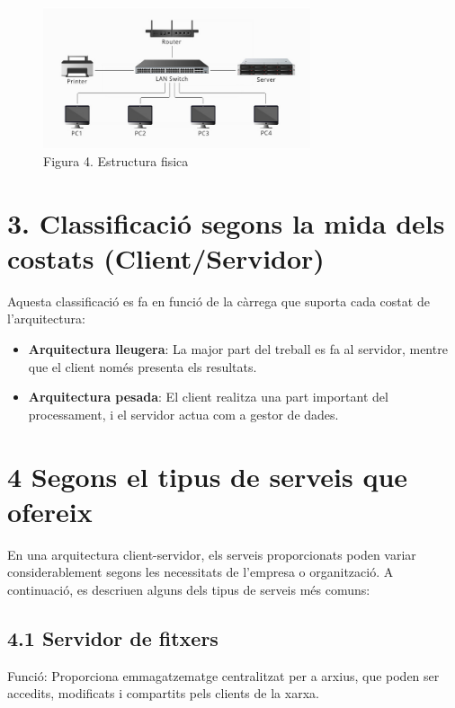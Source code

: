 \documentclass[
  a4paper,
]{article}
\providecommand{\tightlist}{%
  \setlength{\itemsep}{0pt}\setlength{\parskip}{0pt}}
\begin{document}
\begin{figure}
\centering
\includegraphics[width=0.7\textwidth,height=\textheight]{png/csXarxaFisica.png}
\caption{Figura 4. Estructura fisica}
\end{figure}

\section{3. Classificació segons la mida dels costats
(Client/Servidor)}\label{classificaciuxf3-segons-la-mida-dels-costats-clientservidor}

Aquesta classificació es fa en funció de la càrrega que suporta cada
costat de l'arquitectura:

\begin{itemize}
\tightlist
\item
  \textbf{Arquitectura lleugera}: La major part del treball es fa al
  servidor, mentre que el client només presenta els resultats.
\item
  \textbf{Arquitectura pesada}: El client realitza una part important
  del processament, i el servidor actua com a gestor de dades.
\end{itemize}

\section{4 Segons el tipus de serveis que
ofereix}\label{segons-el-tipus-de-serveis-que-ofereix}

En una arquitectura client-servidor, els serveis proporcionats poden
variar considerablement segons les necessitats de l'empresa o
organització. A continuació, es descriuen alguns dels tipus de serveis
més comuns:

\subsection{4.1 Servidor de fitxers}\label{servidor-de-fitxers}

Funció: Proporciona emmagatzematge centralitzat per a arxius, que poden
ser accedits, modificats i compartits pels clients de la xarxa.
\end{document}
